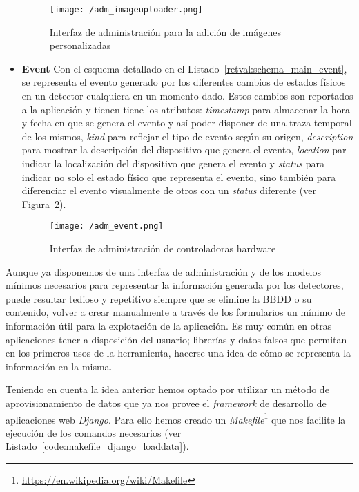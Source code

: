 \begin{itemize}
\begin{figure}[h]
\centering
\texttt{[image: /adm\_imageuploader.png]}
\caption{Interfaz de administración para la adición de imágenes personalizadas}
\label{fig:adm_imageuploader}
\end{figure}


\item \textbf{Event} Con el esquema detallado en el Listado~\ref{retval:schema_main_event}, se representa el evento generado por los diferentes cambios de estados físicos en un detector cualquiera en un momento dado. Estos cambios son reportados a la aplicación y tienen tiene los atributos: \textit{timestamp} para almacenar la hora y fecha en que se genera el evento y así poder disponer de una  traza temporal de los mismos, \textit{kind} para reflejar el tipo de evento según su origen, \textit{description} para mostrar la descripción del dispositivo que genera el evento, \textit{location} par indicar la localización del dispositivo que genera el evento y \textit{status} para indicar no solo el estado físico que representa el evento, sino también para diferenciar el evento visualmente de otros con un \textit{status} diferente (ver Figura~\ref{fig:adm_event}). 



\begin{figure}[h]
\centering
\texttt{[image: /adm\_event.png]}
\caption{Interfaz de administración de controladoras hardware}
\label{fig:adm_event}
\end{figure}

\end{itemize}

Aunque ya disponemos de una interfaz de administración y de los modelos mínimos necesarios para representar la información generada por los detectores, puede resultar tedioso y repetitivo siempre que se elimine la \acs{BBDD} o su contenido, volver a crear manualmente a través de los formularios un mínimo de información útil para la explotación de la aplicación. Es muy común en otras aplicaciones tener a disposición del usuario; librerías y datos falsos que permitan en los primeros usos de la herramienta, hacerse una idea de cómo se representa la información en la misma. 

Teniendo en cuenta la idea anterior hemos optado por utilizar un método de aprovisionamiento de datos que ya nos provee el \textit{framework} de desarrollo de aplicaciones web \textit{Django}. Para ello hemos creado un \textit{Makefile}\footnote{\url{https://en.wikipedia.org/wiki/Makefile}} que nos facilite la ejecución de los comandos necesarios (ver Listado~\ref{code:makefile_django_loaddata}).

